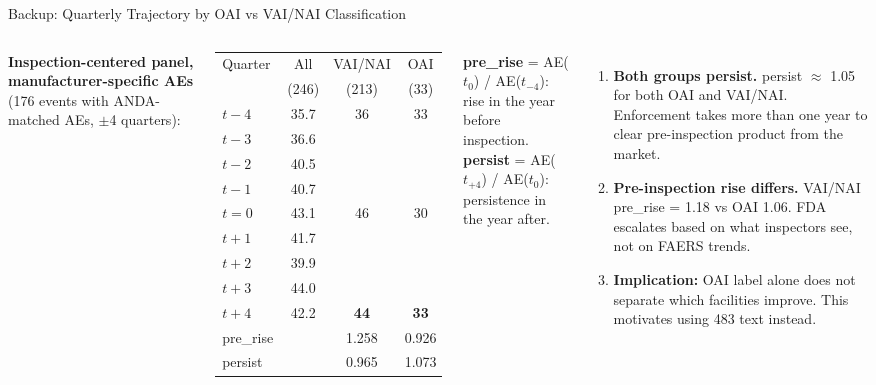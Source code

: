 \documentclass[aspectratio=169,10pt]{beamer}
\newcommand{\highlight}[1]{{\color{ncsuRed}\textbf{#1}}}
\begin{document}
\begin{frame}{Backup: Quarterly Trajectory by OAI vs VAI/NAI Classification}
\begin{columns}[T]
\textbf{Inspection-centered panel, manufacturer-specific AEs} (176 events with ANDA-matched AEs, $\pm$4 quarters):

\vspace{4pt}
\begin{tabular}{lccc}
\toprule
Quarter & All & VAI/NAI & OAI \\
& (246) & (213) & (33) \\
\midrule
$t-4$ & 35.7 & 36 & 33 \\
$t-3$ & 36.6 & & \\
$t-2$ & 40.5 & & \\
$t-1$ & 40.7 & & \\
$t=0$ & 43.1 & 46 & 30 \\
$t+1$ & 41.7 & & \\
$t+2$ & 39.9 & & \\
$t+3$ & 44.0 & & \\
$t+4$ & 42.2 & \highlight{44} & \highlight{33} \\
\midrule
pre\_rise & & 1.258 & 0.926 \\
persist & & 0.965 & 1.073 \\
\bottomrule
\end{tabular}

\vspace{4pt}
{\scriptsize
\textbf{pre\_rise} = AE($t_0$) / AE($t_{-4}$): rise in the year before inspection.\\
\textbf{persist} = AE($t_{+4}$) / AE($t_0$): persistence in the year after.}

\begin{enumerate}
  \item \textbf{Both groups persist.} persist $\approx$ 1.05 for both OAI and VAI/NAI. Enforcement takes more than one year to clear pre-inspection product from the market.

  \item \textbf{Pre-inspection rise differs.} VAI/NAI pre\_rise = 1.18 vs OAI 1.06. FDA escalates based on what inspectors see, not on FAERS trends.

  \item \textbf{Implication:} OAI label alone does not separate which facilities improve. This motivates using 483 text instead.
\end{enumerate}
\end{columns}
\end{frame}
\end{document}
